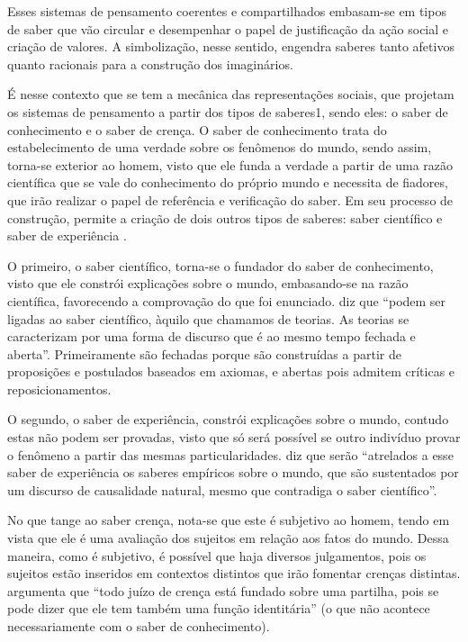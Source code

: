\documentclass[portuguese]{textolivre}
\begin{document}
Esses sistemas de pensamento coerentes e compartilhados embasam-se em tipos de saber que vão circular e desempenhar o papel de justificação da ação social e criação de valores. A simbolização, nesse sentido, engendra saberes tanto afetivos quanto racionais para a construção dos imaginários. 

É nesse contexto que se tem a mecânica das representações sociais, que projetam os sistemas de pensamento a partir dos tipos de saberes1, sendo eles: o saber de conhecimento e o saber de crença. O saber de conhecimento trata do estabelecimento de uma verdade sobre os fenômenos do mundo, sendo assim, torna-se exterior ao homem, visto que ele funda a verdade a partir de uma razão científica que se vale do conhecimento do próprio mundo e necessita de fiadores, que irão realizar o papel de referência e verificação do saber. Em seu processo de construção, permite a criação de dois outros tipos de saberes: saber científico e saber de experiência \cite{charaudeau_os_2017}.

O primeiro, o saber científico, torna-se o fundador do saber de conhecimento, visto que ele constrói explicações sobre o mundo, embasando-se na razão científica, favorecendo a comprovação do que foi enunciado. \textcite[p. 581]{charaudeau_os_2017} diz que “podem ser ligadas ao saber científico, àquilo que chamamos de teorias. As teorias se caracterizam por uma forma de discurso que é ao mesmo tempo fechada e aberta”. Primeiramente são fechadas porque são construídas a partir de proposições e postulados baseados em axiomas, e abertas pois admitem críticas e reposicionamentos. 

O segundo, o saber de experiência, constrói explicações sobre o mundo, contudo estas não podem ser provadas, visto que só será possível se outro indivíduo provar o fenômeno a partir das mesmas particularidades. \textcite[p. 582]{charaudeau_os_2017} diz que serão “atrelados a esse saber de experiência os saberes empíricos sobre o mundo, que são sustentados por um discurso de causalidade natural, mesmo que contradiga o saber científico”. 

No que tange ao saber crença, nota-se que este é subjetivo ao homem, tendo em vista que ele é uma avaliação dos sujeitos em relação aos fatos do mundo. Dessa maneira, como é subjetivo, é possível que haja diversos julgamentos, pois os sujeitos estão inseridos em contextos distintos que irão fomentar crenças distintas. \textcite[p. 198]{charaudeau_discurso_2018} argumenta que “todo juízo de crença está fundado sobre uma partilha, pois se pode dizer que ele tem também uma função identitária” (o que não acontece necessariamente com o saber de conhecimento). 
\end{document}
